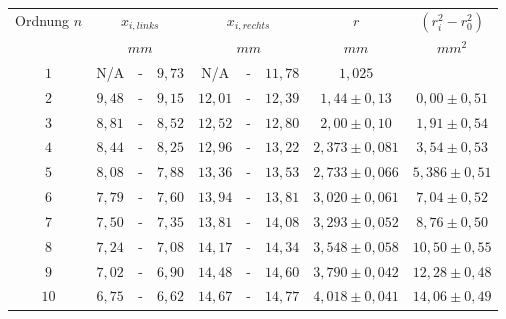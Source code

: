 \begin{tabular}{c|ccc|ccc|c|c} 
Ordnung \(n\) & \multicolumn{3}{c|}{\(x_{i,links}\)} & \multicolumn{3}{c|}{\(x_{i,rechts}\)} & \(r\) & \(\left( r_i^2 - r_0^2 \right)\)\\
& \multicolumn{3}{c|}{\(mm\)} & \multicolumn{3}{c|}{\(mm\)}  & \(mm\) & \(mm^2\) \\ \hline
\(1\) & N/A & - & \(9,73\) & N/A & - & \(11,78\) & \(1,025\) & \\ 
\(2\) & \(9,48\) & - & \(9,15\) & \(12,01\)  & - & \(12,39\) & \(1,44\pm 0,13\) & \(0,00\pm 0,51\)\\ 
\(3\) & \(8,81\) & - & \(8,52\) & \(12,52\)  & - & \(12,80\) & \(2,00\pm 0,10\) & \(1,91\pm 0,54\)\\ 
\(4\) & \(8,44\) & - & \(8,25\) & \(12,96\)  & - & \(13,22\) & \(2,373\pm 0,081\) & \(3,54\pm 0,53\)\\ 
\(5\) & \(8,08\) & - & \(7,88\) & \(13,36\)  & - & \(13,53\) & \(2,733\pm 0,066\) & \(5,386\pm 0,51\)\\ 
\(6\) & \(7,79\) & - & \(7,60\) & \(13,94\)  & - & \(13,81\) & \(3,020\pm 0,061\) & \(7,04\pm 0,52\)\\ 
\(7\) & \(7,50\) & - & \(7,35\) & \(13,81\)  & - & \(14,08\) & \(3,293\pm 0,052\) & \(8,76\pm 0,50\)\\ 
\(8\) & \(7,24\) & - & \(7,08\) & \(14,17\)  & - & \(14,34\) & \(3,548\pm 0,058\) & \(10,50\pm 0,55\)\\ 
\(9\) & \(7,02\) & - & \(6,90\) & \(14,48\)  & - & \(14,60\) & \(3,790\pm 0,042\) & \(12,28\pm 0,48\)\\ 
\(10\) & \(6,75\) & - & \(6,62\) & \(14,67\)  & - & \(14,77\) & \(4,018\pm 0,041\) & \(14,06\pm 0,49\)\\ 

\end{tabular}